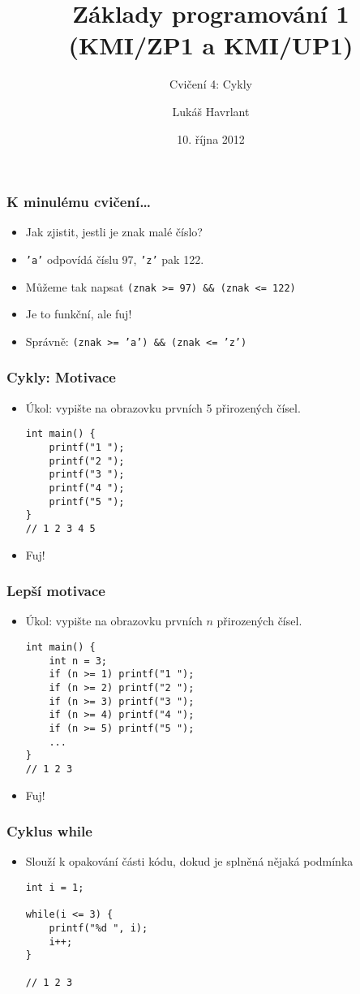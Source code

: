 \documentclass{beamer}
\title{Základy programování 1 (KMI/ZP1 a KMI/UP1)}
\subtitle{Cvičení 4: Cykly}
\author{Lukáš Havrlant}
\date{10. října 2012}
\institute{Univerzita Palackého}
\newenvironment{itemizex}%
  {\large \begin{itemize}%
    \setlength{\itemsep}{8pt}%
    \setlength{\parskip}{8pt}}%
  {\end{itemize}}
\begin{document}
\begin{frame}[t,plain]
\titlepage
\end{frame}


\begin{frame}[t,fragile]\frametitle{K minulému cvičení\dots} 
  \begin{itemizex}
    \item Jak zjistit, jestli je znak malé číslo?
    \item \texttt{'a'} odpovídá číslu 97, \texttt{'z'} pak 122.
    \item Můžeme tak napsat \texttt{(znak >= 97) \&\& (znak <= 122)}
    \item Je to funkční, ale fuj!
    \item Správně: \texttt{(znak >= 'a') \&\& (znak <= 'z')}
  \end{itemizex}
\end{frame}


\begin{frame}[t,fragile]\frametitle{Cykly: Motivace} 
  \begin{itemizex}
    \item Úkol: vypište na obrazovku prvních 5 přirozených čísel. 
    \begin{verbatim} 
int main() {
    printf("1 ");
    printf("2 ");
    printf("3 ");
    printf("4 ");
    printf("5 ");
}
// 1 2 3 4 5
    \end{verbatim}
    \item Fuj!
  \end{itemizex}
\end{frame}


\begin{frame}[t,fragile]\frametitle{Lepší motivace} 
  \begin{itemize}
    \item Úkol: vypište na obrazovku prvních $n$ přirozených čísel.
    \begin{verbatim} 
int main() {
    int n = 3;
    if (n >= 1) printf("1 ");
    if (n >= 2) printf("2 ");
    if (n >= 3) printf("3 ");
    if (n >= 4) printf("4 ");
    if (n >= 5) printf("5 ");
    ...
}
// 1 2 3
    \end{verbatim}
    \item Fuj!
  \end{itemize}
\end{frame}


\begin{frame}[t,fragile]\frametitle{Cyklus while} 
  \begin{itemizex}
    \item Slouží k opakování části kódu, dokud je splněná nějaká podmínka
    \begin{verbatim} 
int i = 1;

while(i <= 3) {
    printf("%d ", i);
    i++;
}

// 1 2 3
    \end{verbatim}
  \end{itemizex}
\end{frame}
\end{document}
